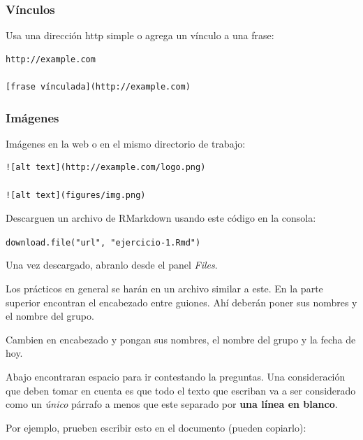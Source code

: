 \documentclass[]{book}
\theoremstyle{definition}
\theoremstyle{definition}
\theoremstyle{definition}
\theoremstyle{remark}
\let\BeginKnitrBlock\begin \let\EndKnitrBlock\end
\begin{document}
\hypertarget{vinculos}{%
\subsubsection{Vínculos}\label{vinculos}}

Usa una dirección http simple o agrega un vínculo a una frase:

\begin{verbatim}
http://example.com

[frase vínculada](http://example.com)
\end{verbatim}

\hypertarget{imagenes}{%
\subsubsection{Imágenes}\label{imagenes}}

Imágenes en la web o en el mismo directorio de trabajo:

\begin{verbatim}
![alt text](http://example.com/logo.png)

![alt text](figures/img.png)
\end{verbatim}

\BeginKnitrBlock{exercise}[Probando markdown]
\protect\hypertarget{exr:ejercicio-1}{}{\label{exr:ejercicio-1}
{} }Descarguen un archivo de RMarkdown
usando este código en la consola:

\texttt{download.file("url",\ "ejercicio-1.Rmd")}

Una vez descargado, abranlo desde el panel \emph{Files}.
\EndKnitrBlock{exercise}

Los prácticos en general se harán en un archivo similar a este. En la
parte superior encontran el encabezado entre guiones. Ahí deberán poner
sus nombres y el nombre del grupo.

\BeginKnitrBlock{exercise}[Personalizando]
\protect\hypertarget{exr:ejercicio-2}{}{\label{exr:ejercicio-2}
{} }Cambien en encabezado y pongan sus
nombres, el nombre del grupo y la fecha de hoy.
\EndKnitrBlock{exercise}

Abajo encontraran espacio para ir contestando la preguntas. Una
consideración que deben tomar en cuenta es que todo el texto que
escriban va a ser considerado como un \emph{único} párrafo a menos que
este separado por \textbf{una línea en blanco}.

Por ejemplo, prueben escribir esto en el documento (pueden copiarlo):
\end{document}
